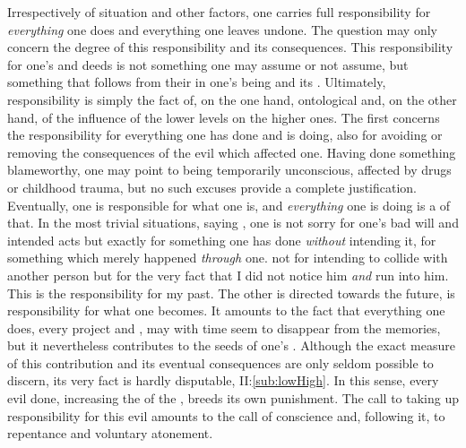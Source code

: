 Irrespectively of situation and other factors, one carries full 
responsibility for {\em everything} one does and everything one leaves undone.
The question may only concern the degree of this responsibility and its
consequences.
%
This  responsibility for one's  and deeds is not something
one may assume or not assume, but something that follows from their
 in one's being and its .  Ultimately,
responsibility is simply the fact of, on the one hand, ontological
 and, on the other hand, of the influence of the lower levels on
the higher ones. The first  concerns the  responsibility
for everything one has done and is doing, also for avoiding or removing the
consequences of the evil which affected one. Having done something blameworthy,
one may point to being temporarily unconscious, affected by drugs or childhood
trauma, but no such excuses provide a complete justification.  Eventually, one
is responsible for what one is, and {\em everything} one is doing is a
 of that. In the most trivial situations, saying , one is not sorry for one's bad will and intended acts but exactly for
something one has done {\em without} intending it, for something which merely
happened {\em through} one.  not for intending to collide with
another person but for the very fact that I did not notice him {\em and} run
into him.  This is the  responsibility for my past. The other 
is directed towards the future, is responsibility for what one becomes. It
amounts to the fact that everything one does, every  project and
, may with time seem to disappear from the  memories, but it
nevertheless contributes to the  seeds of one's . Although
the exact measure of this contribution and its eventual consequences are only
seldom possible to discern, its very fact is hardly disputable,
II:\ref{sub:lowHigh}.  In this sense, every evil done, increasing the
 of the , breeds its own punishment. The call to taking
up responsibility for this evil amounts to the call of conscience and, following
it, to repentance and voluntary atonement.

